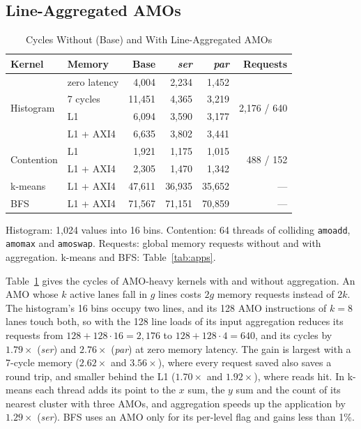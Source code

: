 \documentclass[journal]{IEEEtran}
\begin{document}
\subsection{Line-Aggregated AMOs}\label{sec:evalamo}
\begin{table}[t]
\caption{Cycles Without (Base) and With Line-Aggregated AMOs}
\label{tab:amo}
\centering\footnotesize
\begin{tabular}{llrrrr}
\toprule
Kernel & Memory & Base & \emph{ser} & \emph{par} & Requests\\
\midrule
\multirow{4}{*}{Histogram} & zero latency & 4,004 & 2,234 & 1,452 & \multirow{4}{*}{2,176 / 640}\\
 & 7 cycles     & 11,451 & 4,365 & 3,219 & \\
 & L1           & 6,094  & 3,590 & 3,177 & \\
 & L1 + AXI4    & 6,635  & 3,802 & 3,441 & \\
\midrule
\multirow{2}{*}{Contention} & L1        & 1,921 & 1,175 & 1,015 & \multirow{2}{*}{488 / 152}\\
 & L1 + AXI4    & 2,305  & 1,470 & 1,342 & \\
\midrule
k-means & L1 + AXI4 & 47,611 & 36,935 & 35,652 & ---\\
BFS     & L1 + AXI4 & 71,567 & 71,151 & 70,859 & ---\\
\bottomrule
\end{tabular}

\vspace{2pt}
\begin{minipage}{\columnwidth}\footnotesize
Histogram: 1,024 values into 16 bins. Contention: 64 threads of colliding
\texttt{amoadd}, \texttt{amomax} and \texttt{amoswap}. Requests: global memory
requests without and with aggregation. k-means and BFS: Table~\ref{tab:apps}.
\end{minipage}
\end{table}

Table~\ref{tab:amo} gives the cycles of AMO-heavy kernels with and without
aggregation. An AMO whose $k$ active lanes fall in $g$ lines costs $2g$ memory
requests instead of $2k$. The histogram's 16 bins occupy two lines, and its 128
AMO instructions of $k=8$ lanes touch both, so with the 128 line loads of its
input aggregation reduces its requests from $128+128\cdot16=2{,}176$ to
$128+128\cdot4=640$, and its cycles by $1.79\times$ (\emph{ser}) and $2.76\times$
(\emph{par}) at zero memory latency. The gain is largest with a 7-cycle memory
($2.62\times$ and $3.56\times$), where every request saved also saves a round
trip, and smaller behind the L1 ($1.70\times$ and $1.92\times$), where reads hit.
In k-means each thread adds its point to the $x$ sum, the $y$ sum and the count of
its nearest cluster with three AMOs, and aggregation speeds up the application by
$1.29\times$ (\emph{ser}). BFS uses an AMO only for its per-level flag and gains
less than 1\%.
\end{document}
